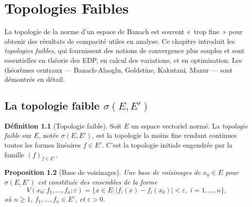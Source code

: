 \documentclass[a4paper,12pt]{book}
\newcommand{\abs}[1]{\left| #1 \right|}
\theoremstyle{definition}
\newtheorem{definition}{Définition}[chapter]
\theoremstyle{plain}
\newtheorem{proposition}[definition]{Proposition}
\theoremstyle{remark}
\begin{document}

\chapter{Topologies Faibles}
\label{chap:topologies-faibles}
\minitoc

\vspace{1em}

La topologie de la norme d'un espace de Banach est souvent «~trop fine~» pour obtenir
des résultats de compacité utiles en analyse. Ce chapitre introduit les
\emph{topologies faibles}, qui fournissent des
notions de convergence plus souples et sont essentielles en théorie des
EDP, en calcul des variations,
et en optimisation. Les théorèmes centraux ---
Banach-Alaoglu,
Goldstine,
Kakutani,
Mazur --- sont démontrés en détail.

\section{La topologie faible $\sigma(E, E')$}
\label{sec:topo-faible}


\begin{definition}[Topologie faible]
\label{def:topo-faible}
Soit $E$ un espace vectoriel normé. La \emph{topologie faible} sur $E$, notée
$\sigma(E, E')$, est la topologie la moins fine rendant continues toutes les formes
linéaires $f \in E'$. C'est la topologie initiale
engendrée par la famille $(f)_{f \in E'}$.
\end{definition}

\begin{proposition}[Base de voisinages]
\label{prop:base-voisinages-faible}
Une base de voisinages de $x_0 \in E$ pour $\sigma(E, E')$ est constituée des
ensembles de la forme
\[
  V(x_0; f_1, \ldots, f_n; \varepsilon) = \bigl\{ x \in E :
  \abs{f_i(x) - f_i(x_0)} < \varepsilon, \; i = 1, \ldots, n \bigr\},
\]
où $n \ge 1$, $f_1, \ldots, f_n \in E'$, et $\varepsilon > 0$.
\end{proposition}
\end{document}
